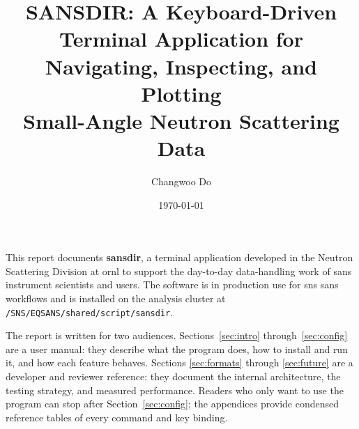 \documentclass[tm]{ornltm}
\author{Changwoo Do}
\title{SANSDIR: A Keyboard-Driven Terminal Application for\\
Navigating, Inspecting, and Plotting\\
Small-Angle Neutron Scattering Data}
\date{\today}
\begin{document}
\frontmatter

\tableofcontents
\listoffigures
\listoftables
\printacronyms

\begin{foreword}

This report documents \textbf{sansdir}, a terminal application developed in the
Neutron Scattering Division at \ac{ornl} to support the day-to-day data-handling
work of \ac{sans} instrument scientists and users. The software is in production
use for \ac{sns} \ac{sans} workflows and is installed on the analysis cluster at
\texttt{/SNS/EQSANS/shared/script/sansdir}.

The report is written for two audiences. Sections~\ref{sec:intro}
through~\ref{sec:config} are a user manual: they describe what the program does,
how to install and run it, and how each feature behaves. Sections
\ref{sec:formats} through \ref{sec:future} are a developer and reviewer
reference: they document the internal architecture, the testing strategy, and
measured performance. Readers who
only want to use the program can stop after Section~\ref{sec:config}; the
appendices provide condensed reference tables of every command and key binding.

\end{foreword}
\end{document}
